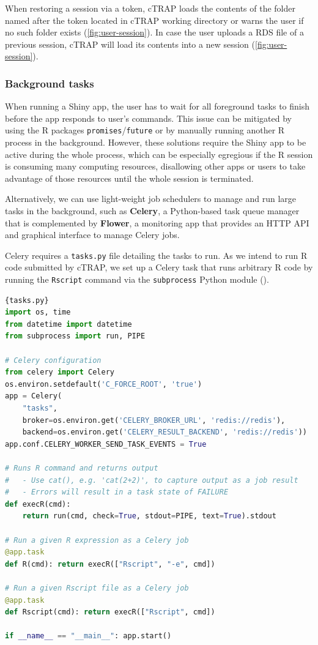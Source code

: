 When restoring a session via a token, cTRAP loads the contents of the folder named after the token located in cTRAP working directory or warns the user if no such folder exists (\autoref{fig:user-session}). In case the user uploads a RDS file of a previous session, cTRAP will load its contents into a new session (\autoref{fig:user-session}).

\subsubsection{Background tasks}
\label{subsec:background-tasks}

When running a Shiny app, the user has to wait for all foreground tasks to finish before the app responds to user's commands. This issue can be mitigated by using the R packages \texttt{promises}/\texttt{future} or by manually running another R process in the background. However, these solutions require the Shiny app to be active during the whole process, which can be especially egregious if the R session is consuming many computing resources, disallowing other apps or users to take advantage of those resources until the whole session is terminated.

Alternatively, we can use light-weight job schedulers to manage and run large tasks in the background, such as  \textbf{Celery}, a Python-based task queue manager that is complemented by \textbf{Flower}, a monitoring app that provides an HTTP API and graphical interface to manage Celery jobs.

Celery requires a \texttt{tasks.py} file detailing the tasks to run. As we intend to run R code submitted by cTRAP, we set up a Celery task that runs arbitrary R code by running the \texttt{Rscript} command via the \texttt{subprocess} Python module ().

\begin{lstlisting}[language=python,caption=An example \texttt{tasks.py} file to run R commands or Rscript files via Celery.,label={lst:tasks.py},morekeywords={import},keywordstyle=\bfseries]{tasks.py}
import os, time
from datetime import datetime
from subprocess import run, PIPE

# Celery configuration
from celery import Celery
os.environ.setdefault('C_FORCE_ROOT', 'true')
app = Celery(
    "tasks",
    broker=os.environ.get('CELERY_BROKER_URL', 'redis://redis'),
    backend=os.environ.get('CELERY_RESULT_BACKEND', 'redis://redis'))
app.conf.CELERY_WORKER_SEND_TASK_EVENTS = True

# Runs R command and returns output
#   - Use cat(), e.g. 'cat(2+2)', to capture output as a job result
#   - Errors will result in a task state of FAILURE
def execR(cmd):
    return run(cmd, check=True, stdout=PIPE, text=True).stdout

# Run a given R expression as a Celery job
@app.task
def R(cmd): return execR(["Rscript", "-e", cmd])

# Run a given Rscript file as a Celery job
@app.task
def Rscript(cmd): return execR(["Rscript", cmd])

if __name__ == "__main__": app.start()
\end{lstlisting}

